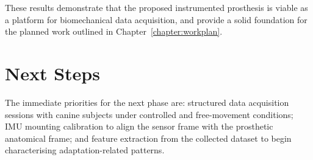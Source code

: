 These results demonstrate that the proposed instrumented prosthesis is viable
as a platform for biomechanical data acquisition, and provide a solid
foundation for the planned work outlined in Chapter~\ref{chapter:workplan}.

\section{Next Steps}

The immediate priorities for the next phase are: structured data acquisition
sessions with canine subjects under controlled and free-movement conditions;
IMU mounting calibration to align the sensor frame with the prosthetic
anatomical frame; and feature extraction from the collected dataset to begin
characterising adaptation-related patterns.
